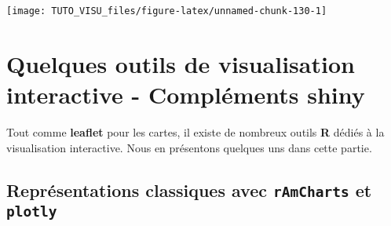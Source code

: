 \documentclass[]{article}
\newenvironment{Shaded}{\begin{snugshade}}{\end{snugshade}}
\newcommand{\DataTypeTok}[1]{\textcolor[rgb]{0.13,0.29,0.53}{#1}}
\newcommand{\DecValTok}[1]{\textcolor[rgb]{0.00,0.00,0.81}{#1}}
\newcommand{\FloatTok}[1]{\textcolor[rgb]{0.00,0.00,0.81}{#1}}
\newcommand{\KeywordTok}[1]{\textcolor[rgb]{0.13,0.29,0.53}{\textbf{#1}}}
\newcommand{\NormalTok}[1]{#1}
\newcommand{\OperatorTok}[1]{\textcolor[rgb]{0.81,0.36,0.00}{\textbf{#1}}}
\newcommand{\OtherTok}[1]{\textcolor[rgb]{0.56,0.35,0.01}{#1}}
\newcommand{\StringTok}[1]{\textcolor[rgb]{0.31,0.60,0.02}{#1}}
\theoremstyle{definition}
\theoremstyle{definition}
\theoremstyle{definition}
\theoremstyle{remark}
\begin{document}
\begin{Shaded}
\end{Shaded}

\begin{center}\texttt{[image: TUTO\_VISU\_files/figure-latex/unnamed-chunk-130-1]} \end{center}

\hypertarget{quelques-outils-de-visualisation-interactive---compluxe9ments-shiny}{%
\section{Quelques outils de visualisation interactive - Compléments shiny}\label{quelques-outils-de-visualisation-interactive---compluxe9ments-shiny}}

Tout comme \textbf{leaflet} pour les cartes, il existe de nombreux outils \textbf{R} dédiés à la visualisation interactive. Nous en présentons quelques uns dans cette partie.

\hypertarget{repruxe9sentations-classiques-avec-ramcharts-et-plotly}{%
\subsection{\texorpdfstring{Représentations classiques avec \texttt{rAmCharts} et \texttt{plotly}}{Représentations classiques avec rAmCharts et plotly}}\label{repruxe9sentations-classiques-avec-ramcharts-et-plotly}}
\end{document}
